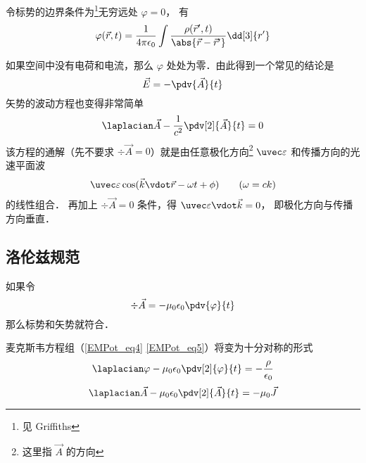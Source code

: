 令标势的边界条件为\footnote{见 Griffiths}无穷远处 $\varphi = 0$， 有
\begin{equation}
\varphi(\vec r, t) = \frac{1}{4\pi\epsilon_0} \int \frac{\rho(\vec r', t)}{\abs{\vec r - \vec r'}} \dd[3]{r'}
\end{equation}

如果空间中没有电荷和电流，那么 $\varphi$ 处处为零．由此得到一个常见的结论是
\begin{equation}
\vec E = - \pdv{\vec A}{t}
\end{equation}
矢势的波动方程也变得非常简单
\begin{equation}
\laplacian \vec A - \frac{1}{c^2} \pdv[2]{\vec A}{t} = 0
\end{equation}
该方程的通解（先不要求 $\div \vec A = 0$）就是由任意极化方向\footnote{这里指 $\vec A$ 的方向} $\uvec \varepsilon$ 和传播方向的光速平面波
\begin{equation}
\uvec \varepsilon \cos(\vec k \vdot \vec r - \omega t + \phi) \qquad (\omega = ck)
\end{equation}
的线性组合． 再加上 $\div \vec A = 0$ 条件，得 $\uvec \varepsilon \vdot \vec k = 0$， 即极化方向与传播方向垂直．

\subsection{洛伦兹规范}
如果令
\begin{equation}
\div \vec A = -\mu_0 \epsilon_0 \pdv{\varphi}{t}
\end{equation}
那么标势和矢势就符合． 

麦克斯韦方程组（\autoref{EMPot_eq4} \autoref{EMPot_eq5}）将变为十分对称的形式
\begin{equation}\label{Gauge_eq14}
\laplacian \varphi - \mu_0\epsilon_0 \pdv[2]{\varphi}{t} = -\frac{\rho}{\epsilon_0}
\end{equation}
\begin{equation}\label{Gauge_eq15}
\laplacian \vec A - \mu_0\epsilon_0 \pdv[2]{\vec A}{t} = -\mu_0 \vec J
\end{equation}
